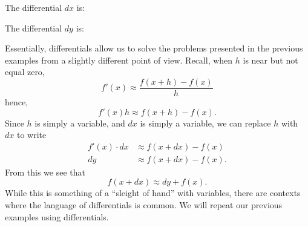 \documentclass{ximera}
\begin{document}
\begin{question}
  The differential $dx$ is:
  \begin{multipleChoice}
  \end{multipleChoice}
  \begin{question}
    The differential $dy$ is:
    \begin{multipleChoice}
    \end{multipleChoice}
  \end{question}
\end{question}

Essentially, differentials allow us to solve the problems presented in
the previous examples from a slightly different point of view. Recall,
when $h$ is near but not equal zero,
\[
f'(x) \approx \frac{f(x+h)-f(x)}{h}
\]
hence, 
\[
f'(x)h \approx f(x+h)-f(x).
\]
Since $h$ is simply a variable, and $dx$ is simply a variable, we can replace $h$ with $dx$ to write
\begin{align*}
f'(x)\cdot dx &\approx f(x+dx)-f(x)\\
dy &\approx f(x+dx)-f(x).
\end{align*}
From this we see that 
\[
f(x+dx)\approx dy + f(x).
\]
While this is something of a ``sleight of hand'' with variables, there
are contexts where the language of differentials is common. We will
repeat our previous examples using differentials.
\end{document}
